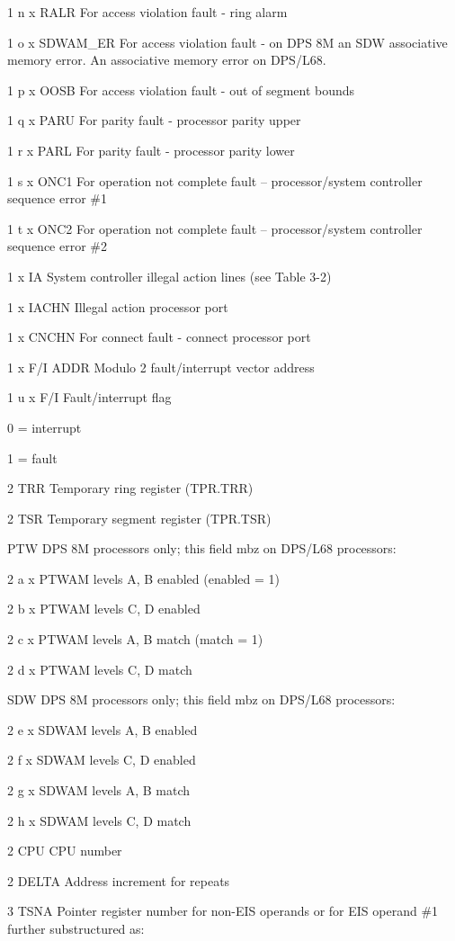 1 n x RALR For access violation fault - ring alarm

1 o x SDWAM\_ER For access violation fault - on DPS 8M an SDW associative
memory error. An associative memory error on DPS/L68.

1 p x OOSB For access violation fault - out of segment bounds

1 q x PARU For parity fault - processor parity upper

1 r x PARL For parity fault - processor parity lower

1 s x ONC1 For operation not complete fault -- processor/system controller
sequence error \#1

1 t x ONC2 For operation not complete fault -- processor/system controller
sequence error \#2

1 x IA System controller illegal action lines (see Table 3-2)

1 x IACHN Illegal action processor port

1 x CNCHN For connect fault - connect processor port

1 x F/I ADDR Modulo 2 fault/interrupt vector address

1 u x F/I Fault/interrupt flag

0 = interrupt

1 = fault

2 TRR Temporary ring register (TPR.TRR)

2 TSR Temporary segment register (TPR.TSR)

PTW DPS 8M processors only; this field mbz on DPS/L68 processors:

2 a x PTWAM levels A, B enabled (enabled = 1)

2 b x PTWAM levels C, D enabled

2 c x PTWAM levels A, B match (match = 1)

2 d x PTWAM levels C, D match

SDW DPS 8M processors only; this field mbz on DPS/L68 processors:

2 e x SDWAM levels A, B enabled

2 f x SDWAM levels C, D enabled

2 g x SDWAM levels A, B match

2 h x SDWAM levels C, D match

2 CPU CPU number

2 DELTA Address increment for repeats

3 TSNA Pointer register number for non-EIS operands or for EIS operand \#1
further substructured as:

